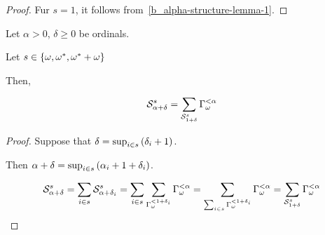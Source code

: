 \begin{proof}
  Fur $s = 1$, it follows from~\cref{b_alpha-structure-lemma-1}.
\end{proof}

\begin{corollary}
  Let $\alpha > 0$, $\delta \ge 0$ be ordinals.

  Let $s \in \left\{ {\omega, \omega^\ast, \omega^\ast + \omega} \right\}$

  Then,

  \[
    \mathcal{S}^{s}_{\alpha + \delta}
    = \sum_{\mathcal{S}^{s}_{1 + \delta}}{\Gamma_{\omega}^{< \alpha}}
  \]
\end{corollary}

\begin{proof}
  Suppose that $\delta = \sup_{i \in s} \left( {\delta_i + 1} \right)$.

  Then $\alpha + \delta = \sup_{i \in s} \left( {\alpha_i + 1 + \delta_i} \right)$.

  \[
    \mathcal{S}^{s}_{\alpha + \delta}
    = \sum_{i \in s}{\mathcal{S}^{s}_{\alpha + \delta_i}}
    = \sum_{i \in s}\sum_{\Gamma_{\omega}^{< 1 + \delta_i}}{\Gamma_{\omega}^{< \alpha}}
    = \sum_{\sum_{i \in s}{\Gamma_{\omega}^{< 1 + \delta_i}}}{\Gamma_{\omega}^{< \alpha}}
    = \sum_{\mathcal{S}^{s}_{1 + \delta}}{\Gamma_{\omega}^{< \alpha}}
  \]
\end{proof}
